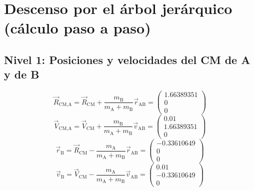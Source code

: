 \documentclass[12pt,oneside]{book}
\begin{document}
\section{Descenso por el árbol jerárquico (cálculo paso a paso)}

\subsection{Nivel 1: Posiciones y velocidades del CM de A y de B}
\[
\vec{R}_{\text{CM,A}} = \vec{R}_{\text{CM}} + \frac{m_{\text{B}}}{m_{\text{A}} + m_{\text{B}}} \vec{r}_{\text{AB}} = \begin{pmatrix} 1.66389351 \\ 0 \\ 0 \end{pmatrix}
\]
\[
\vec{V}_{\text{CM,A}} = \vec{V}_{\text{CM}} + \frac{m_{\text{B}}}{m_{\text{A}} + m_{\text{B}}} \vec{v}_{\text{AB}} = \begin{pmatrix} 0.01 \\ 1.66389351 \\ 0 \end{pmatrix}
\]
\[
\vec{r}_{\text{B}} = \vec{R}_{\text{CM}} - \frac{m_{\text{A}}}{m_{\text{A}} + m_{\text{B}}} \vec{r}_{\text{AB}} = \begin{pmatrix} -0.33610649 \\ 0 \\ 0 \end{pmatrix}
\]
\[
\vec{v}_{\text{B}} = \vec{V}_{\text{CM}} - \frac{m_{\text{A}}}{m_{\text{A}} + m_{\text{B}}} \vec{v}_{\text{AB}} = \begin{pmatrix} 0.01 \\ -0.33610649 \\ 0 \end{pmatrix}
\]
\end{document}
